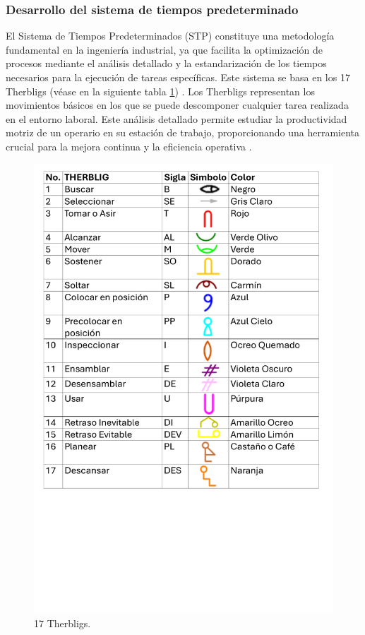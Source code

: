 \subsubsection{Desarrollo del sistema de tiempos predeterminado}
%
El Sistema de Tiempos Predeterminados (STP) constituye una metodología fundamental en la ingeniería industrial, ya que facilita la optimización de procesos mediante el análisis detallado y la estandarización de los tiempos necesarios para la ejecución de tareas específicas. Este sistema se basa en los 17 Therbligs (véase en la siguiente tabla \ref{fig:tablaTherbligs}) \cite{euroinnova2024}. Los Therbligs representan los movimientos básicos en los que se puede descomponer cualquier tarea realizada en el entorno laboral. Este análisis detallado permite estudiar la productividad motriz de un operario en su estación de trabajo, proporcionando una herramienta crucial para la mejora continua y la eficiencia operativa \cite{euroinnova_therbligs}.

\begin{figure}[H]
    \centering
    \includegraphics[scale=0.25]{15/img/tablaTherblig.pdf}
    \caption{17 Therbligs.}
    \label{fig:tablaTherbligs}
\end{figure}

